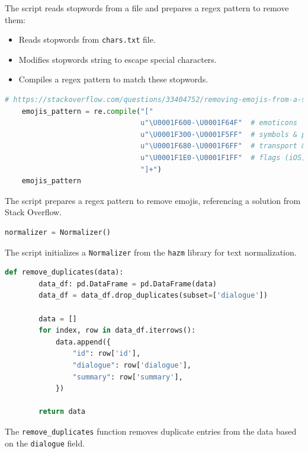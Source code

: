 \documentclass{solutionclass} %
\begin{document}
\begin{solution}
The script reads stopwords from a file and prepares a regex pattern to remove them:

\begin{itemize}
	\item Reads stopwords from \texttt{chars.txt} file.
	\item Modifies stopwords string to escape special characters.
	\item Compiles a regex pattern to match these stopwords.
\end{itemize}
\end{solution}


\begin{lstlisting}[language=Python]
	# https://stackoverflow.com/questions/33404752/removing-emojis-from-a-string-in-python
	emojis_pattern = re.compile("["
								u"\U0001F600-\U0001F64F"  # emoticons
								u"\U0001F300-\U0001F5FF"  # symbols & pictographs
								u"\U0001F680-\U0001F6FF"  # transport & map symbols
								u"\U0001F1E0-\U0001F1FF"  # flags (iOS)
								"]+")
	emojis_pattern
	\end{lstlisting}


\begin{solution}
The script prepares a regex pattern to remove emojis, referencing a solution from Stack Overflow.
\end{solution}

\begin{lstlisting}[language=Python]
	normalizer = Normalizer()
\end{lstlisting}

\begin{solution}
The script initializes a \texttt{Normalizer} from the \texttt{hazm} library for text normalization.
\end{solution}


\begin{lstlisting}[language=Python]
	def remove_duplicates(data):
		data_df: pd.DataFrame = pd.DataFrame(data)
		data_df = data_df.drop_duplicates(subset=['dialogue'])
	
		data = []
		for index, row in data_df.iterrows():
			data.append({
				"id": row['id'],
				"dialogue": row['dialogue'],
				"summary": row['summary'],
			})
	
		return data
	\end{lstlisting}


\begin{solution}
The \texttt{remove\_duplicates} function removes duplicate entries from the data based on the \texttt{dialogue} field.
\end{solution}
\end{document}
